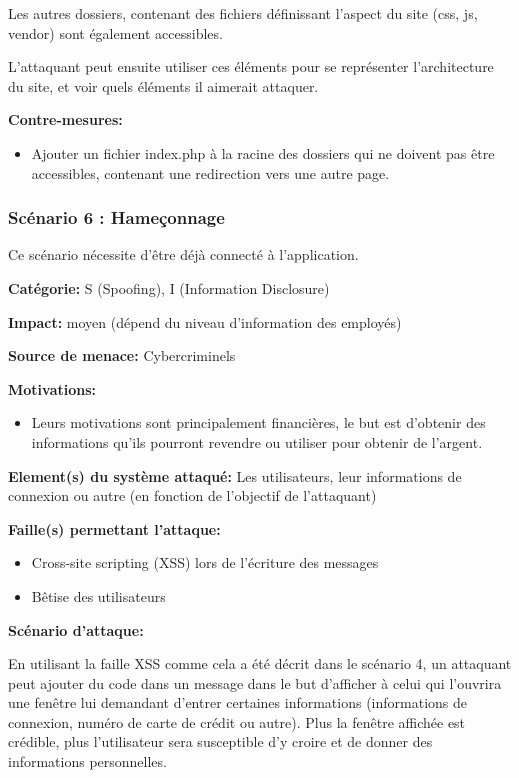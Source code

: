 \documentclass{article}
\begin{document}
Les autres dossiers, contenant des fichiers définissant l'aspect du site
(css, js, vendor) sont également accessibles.

L'attaquant peut ensuite utiliser ces éléments pour se représenter
l'architecture du site, et voir quels éléments il aimerait attaquer.

\textbf{Contre-mesures:}

\begin{itemize}
\tightlist
\item
  Ajouter un fichier index.php à la racine des dossiers qui ne doivent
  pas être accessibles, contenant une redirection vers une autre page.
\end{itemize}

\hypertarget{scuxe9nario-6-hameuxe7onnage}{%
\subsubsection{Scénario 6 :
Hameçonnage}\label{scuxe9nario-6-hameuxe7onnage}}

Ce scénario nécessite d'être déjà connecté à l'application.

\textbf{Catégorie:} S (Spoofing), I (Information Disclosure)

\textbf{Impact:} moyen (dépend du niveau d'information des employés)

\textbf{Source de menace:} Cybercriminels

\textbf{Motivations:}

\begin{itemize}
\tightlist
\item
  Leurs motivations sont principalement financières, le but est
  d'obtenir des informations qu'ils pourront revendre ou utiliser pour
  obtenir de l'argent.
\end{itemize}

\textbf{Element(s) du système attaqué:} Les utilisateurs, leur
informations de connexion ou autre (en fonction de l'objectif de
l'attaquant)

\textbf{Faille(s) permettant l'attaque:}

\begin{itemize}
\tightlist
\item
  Cross-site scripting (XSS) lors de l'écriture des messages
\item
  Bêtise des utilisateurs
\end{itemize}

\textbf{Scénario d'attaque:}

En utilisant la faille XSS comme cela a été décrit dans le scénario 4,
un attaquant peut ajouter du code dans un message dans le but d'afficher
à celui qui l'ouvrira une fenêtre lui demandant d'entrer certaines
informations (informations de connexion, numéro de carte de crédit ou
autre). Plus la fenêtre affichée est crédible, plus l'utilisateur sera
susceptible d'y croire et de donner des informations personnelles.
\end{document}
